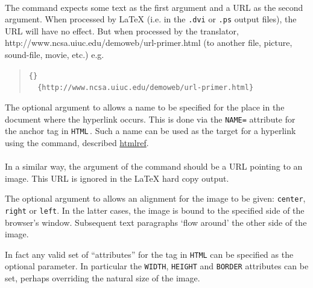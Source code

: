 %
%
\paragraph*{\label{addnormlink}}
The  command expects some text as the first argument 
and a URL as the second argument. 
When processed by \LaTeX{}  (i.e. in the \texttt{.dvi} or \texttt{.ps} output files), 
the URL will have no effect. But when processed by the translator, 
{http://www.ncsa.uiuc.edu/demoweb/url-primer.html} 
(to another file, picture, sound-file, movie, etc.) e.g.
\begin{quote}
\begin{small}
\verb|{|\verb|}|\\
\verb|  {http://www.ncsa.uiuc.edu/demoweb/url-primer.html}|
\end{small}
\end{quote}

%
\begin{changebar}\noindent
The optional argument to  allows a name to be
specified for the place in the document where the hyperlink occurs.
This is done via the \texttt{NAME=}\texttt{} attribute
for the  anchor tag in \texttt{HTML}\,. 
Such a name can be used as the target for a hyperlink using the  command, 
described \hyperref{later}{in Section~}{}{htmlref}.
\end{changebar}


%
\paragraph*{\label{htmladdimg}}
In a similar way, the argument of the  command 
should be a URL pointing to an image. 
This URL is ignored in the \LaTeX{}  hard copy output. 
\begin{changebar}
The optional argument to  allows an alignment
for the image to be given:  \texttt{center}, \texttt{right} or \texttt{left}.
In the latter cases, the image is bound to the specified side
of the browser's window. Subsequent text paragraphs `flow around' the
other side of the image.

\html{\\}
%
In fact any valid set of ``attributes'' for the  tag in \texttt{HTML} 
can be specified as the optional  parameter. In particular
the \texttt{WIDTH}, \texttt{HEIGHT} and \texttt{BORDER} attributes can be set,
perhaps overriding the natural size of the image.
\end{changebar}

